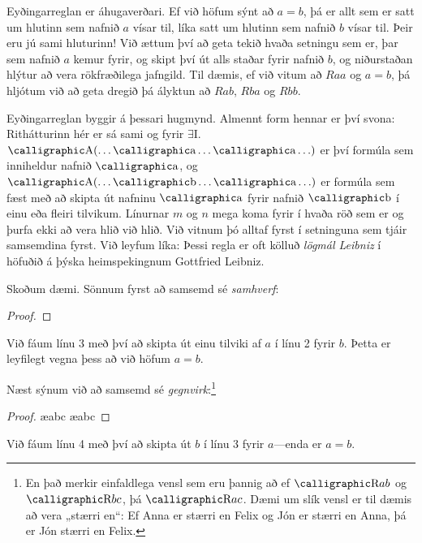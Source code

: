 Eyðingarreglan er áhugaverðari. Ef við höfum sýnt að $a = b$, þá er allt sem er satt um hlutinn sem nafnið $a$ vísar til, líka satt um hlutinn sem nafnið $b$ vísar til. Þeir eru jú sami hluturinn! Við ættum því að geta tekið hvaða setningu sem er, þar sem nafnið $a$ kemur fyrir, og skipt því út alls staðar fyrir nafnið $b$, og niðurstaðan hlýtur að vera rökfræðilega jafngild. Til dæmis, ef við vitum að $Raa$ og $a = b$, þá hljótum við að geta dregið þá ályktun að $Rab$, $Rba$ og $Rbb$.

Eyðingarreglan byggir á þessari hugmynd. Almennt form hennar er því svona:
Rithátturinn hér er sá sami og fyrir $\exists$I. $\meta{A}(\ldots \meta{a} \ldots \meta{a}\ldots)$ er því formúla sem inniheldur nafnið $\meta{a}$, og $\meta{A}(\ldots \meta{b} \ldots \meta{a}\ldots)$ er formúla sem fæst með að skipta út nafninu $\meta{a}$ fyrir nafnið $\meta{b}$ í einu eða fleiri tilvikum. Línurnar $m$ og $n$ mega koma fyrir í hvaða röð sem er og þurfa ekki að vera hlið við hlið. Við vitnum þó alltaf fyrst í setninguna sem tjáir samsemdina fyrst. Við leyfum líka:
Þessi regla er oft kölluð \emph{lögmál Leibniz} í höfuðið á þýska heimspekingnum Gottfried Leibniz. 

Skoðum dæmi. Sönnum fyrst að samsemd sé \emph{samhverf}:
\begin{proof}
	\open
	\close
\end{proof}
Við fáum línu 3 með því að skipta út einu tilviki af $a$ í línu 2 fyrir $b$. Þetta er leyfilegt vegna þess að við höfum $a = b$.

Næst sýnum við að samsemd sé \emph{gegnvirk}:\footnote{En það merkir einfaldlega vensl sem eru þannig að ef $\meta{R}ab$ og $\meta{R}bc$, þá $\meta{R}ac$. Dæmi um slík vensl er til dæmis að vera „stærri en“: Ef Anna er stærri en Felix og Jón er stærri en Anna, þá er Jón stærri en Felix.}
\begin{proof}
	\open
		\ae{abc}
		\ae{abc}
	\close
\end{proof}
Við fáum línu 4 með því að skipta út $b$ í línu 3 fyrir $a$---enda er $a =b$.

